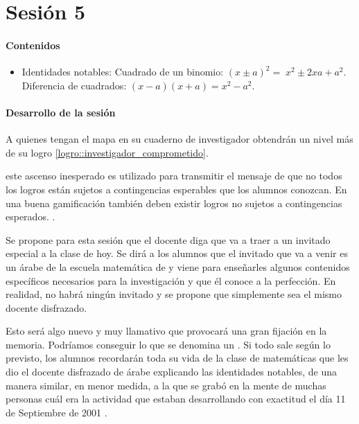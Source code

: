 
\section{Sesión 5}\label{app:ses_comp:5}


\paragraph{Contenidos}
\begin{itemize}
	\item Identidades notables: 
	\subitem Cuadrado de un binomio: $(x\pm a)^2 = \;x^2\pm 2xa + a^2$.
	\subitem Diferencia de cuadrados: $(x-a)(x+a) = x^2-a^2$.
\end{itemize}

\paragraph{Desarrollo de la sesión}

A quienes tengan el mapa en su cuaderno de investigador obtendrán un nivel más de su logro \ref{logro::investigador_comprometido}.

\Justificacion{} este ascenso inesperado es utilizado para transmitir el mensaje de que no todos los logros están sujetos a contingencias esperables que los alumnos conozcan.
%
En una buena gamificación también deben existir logros no sujetos a contingencias esperados. \citep{werbach2012win}.

Se propone para esta sesión que el docente diga que va a traer a un invitado especial a la clase de hoy.
%
Se dirá a los alumnos que el invitado que va a venir es un árabe de la escuela matemática de \arab y viene para enseñarles algunos contenidos específicos necesarios para la investigación y que él conoce a la perfección.
%
En realidad, no habrá ningún invitado y se propone que simplemente sea el mismo docente disfrazado.

Esto será algo nuevo y muy llamativo que provocará una gran fijación en la memoria.
%
Podríamos conseguir lo que se denomina un .
Si todo sale según lo previsto, los alumnos recordarán toda su vida de la clase de matemáticas que les dio el docente disfrazado de árabe explicando las identidades notables, 
%
de una manera similar, en menor medida, a la que se grabó en la mente de muchas personas cuál era la actividad que estaban desarrollando con exactitud el día 11 de Septiembre de 2001 \citep{11s}.


